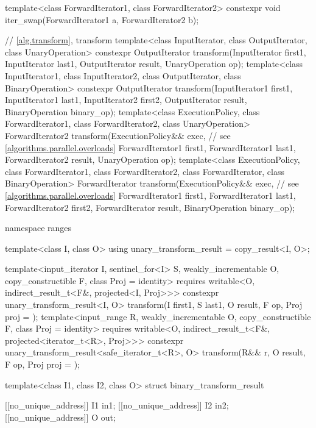 \begin{codeblock}
{  template<class ForwardIterator1, class ForwardIterator2>
    constexpr void iter_swap(ForwardIterator1 a, ForwardIterator2 b);

  // \ref{alg.transform}, transform
  template<class InputIterator, class OutputIterator, class UnaryOperation>
    constexpr OutputIterator
      transform(InputIterator first1, InputIterator last1,
                OutputIterator result, UnaryOperation op);
  template<class InputIterator1, class InputIterator2, class OutputIterator,
           class BinaryOperation>
    constexpr OutputIterator
      transform(InputIterator1 first1, InputIterator1 last1,
                InputIterator2 first2, OutputIterator result,
                BinaryOperation binary_op);
  template<class ExecutionPolicy, class ForwardIterator1, class ForwardIterator2,
           class UnaryOperation>
    ForwardIterator2
      transform(ExecutionPolicy&& exec,                         // see \ref{algorithms.parallel.overloads}
                ForwardIterator1 first1, ForwardIterator1 last1,
                ForwardIterator2 result, UnaryOperation op);
  template<class ExecutionPolicy, class ForwardIterator1, class ForwardIterator2,
           class ForwardIterator, class BinaryOperation>
    ForwardIterator
      transform(ExecutionPolicy&& exec,                         // see \ref{algorithms.parallel.overloads}
                ForwardIterator1 first1, ForwardIterator1 last1,
                ForwardIterator2 first2, ForwardIterator result,
                BinaryOperation binary_op);

  namespace ranges {
    template<class I, class O>
    using unary_transform_result = copy_result<I, O>;

    template<input_iterator I, sentinel_for<I> S, weakly_incrementable O,
             copy_constructible F, class Proj = identity>
      requires writable<O, indirect_result_t<F&, projected<I, Proj>>>
      constexpr unary_transform_result<I, O>
        transform(I first1, S last1, O result, F op, Proj proj = {});
    template<input_range R, weakly_incrementable O, copy_constructible F,
             class Proj = identity>
      requires writable<O, indirect_result_t<F&, projected<iterator_t<R>, Proj>>>
      constexpr unary_transform_result<safe_iterator_t<R>, O>
        transform(R&& r, O result, F op, Proj proj = {});

    template<class I1, class I2, class O>
    struct binary_transform_result {
      [[no_unique_address]] I1 in1;
      [[no_unique_address]] I2 in2;
      [[no_unique_address]] O  out;

}}}
\end{codeblock}

